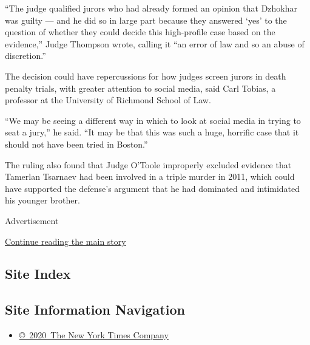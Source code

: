 ``The judge qualified jurors who had already formed an opinion that
Dzhokhar was guilty --- and he did so in large part because they
answered `yes' to the question of whether they could decide this
high-profile case based on the evidence,'' Judge Thompson wrote, calling
it ``an error of law and so an abuse of discretion.''

The decision could have repercussions for how judges screen jurors in
death penalty trials, with greater attention to social media, said Carl
Tobias, a professor at the University of Richmond School of Law.

``We may be seeing a different way in which to look at social media in
trying to seat a jury,'' he said. ``It may be that this was such a huge,
horrific case that it should not have been tried in Boston.''

The ruling also found that Judge O'Toole improperly excluded evidence
that Tamerlan Tsarnaev had been involved in a triple murder in 2011,
which could have supported the defense's argument that he had dominated
and intimidated his younger brother.

Advertisement

\protect\hyperlink{after-bottom}{Continue reading the main story}

\hypertarget{site-index}{%
\subsection{Site Index}\label{site-index}}

\hypertarget{site-information-navigation}{%
\subsection{Site Information
Navigation}\label{site-information-navigation}}

\begin{itemize}
\tightlist
\item
  \href{https://help.nytimes.com/hc/en-us/articles/115014792127-Copyright-notice}{©~2020~The
  New York Times Company}
\end{itemize}

